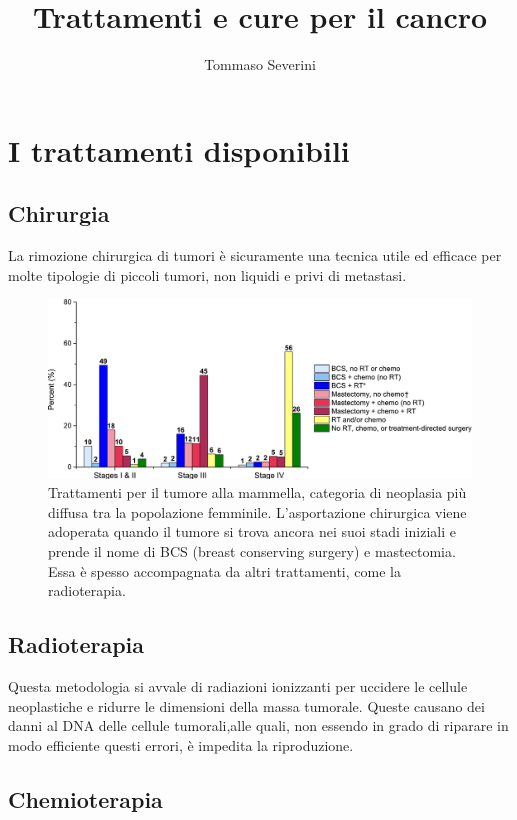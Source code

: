 \documentclass[11pt]{article}
\title{Trattamenti e cure per il cancro}
\author{Tommaso Severini}
\date{}
\begin{document}
	\maketitle


\section*{I trattamenti disponibili}

\subsection*{Chirurgia}

La rimozione chirurgica di tumori è sicuramente una tecnica utile ed efficace per molte tipologie di piccoli tumori, non liquidi e privi di metastasi.

\begin{figure}[h]
	\centering
	\includegraphics[width=0.7\linewidth]{tumore_seno}
	\caption{Trattamenti per il tumore alla mammella, categoria di neoplasia più diffusa tra la popolazione femminile.\cite{di2021numeri} L'asportazione chirurgica viene adoperata quando il tumore si trova ancora nei suoi stadi iniziali e prende il nome di BCS (breast conserving surgery) e mastectomia. Essa è spesso accompagnata da altri trattamenti, come la radioterapia.\cite{miller2019cancer}}
	\label{fig:tumoreseno}
\end{figure}


\subsection*{Radioterapia}

Questa metodologia si avvale di radiazioni ionizzanti per uccidere le cellule neoplastiche e ridurre le dimensioni della massa tumorale. Queste causano dei danni al DNA delle cellule tumorali,alle quali, non essendo in grado di riparare in modo efficiente questi errori, è impedita la riproduzione.


\subsection*{Chemioterapia}
\end{document}
